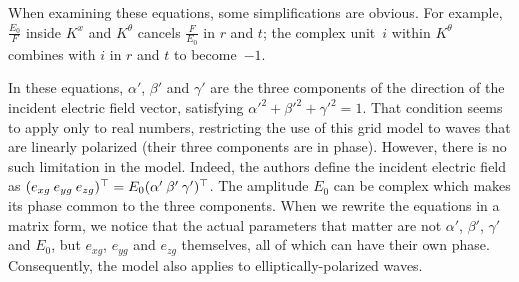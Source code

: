 When examining these equations, some simplifications are obvious.
For example, $\frac{E_0}{F}$ inside $K^x$ and $K^\theta$ cancels $\frac{F}{E_0}$ in $r$ and $t$;
the complex unit~$i$ within $K^\theta$ combines with $i$ in $r$ and $t$ to become~$-1$.

In these equations, $\alpha'$, $\beta'$ and $\gamma'$ are the three components of the direction of the incident electric field vector, satisfying $\alpha'^2 + \beta'^2 + \gamma'^2 = 1$.
That condition seems to apply only to real numbers, restricting the use of this grid model to waves that are linearly polarized (their three components are in phase).
However, there is no such limitation in the model.
Indeed, the authors define the incident electric field as
$(e_{xg} \: e_{yg} \: e_{zg})^\top = E_0(\alpha' \: \beta' \: \gamma')^\top$.
The amplitude $E_0$ can be complex which makes its phase common to the three components.
When we rewrite the equations in a matrix form, we notice that the actual parameters that matter are not $\alpha'$, $\beta'$, $\gamma'$ and $E_0$, but $e_{xg}$, $e_{yg}$ and $e_{zg}$ themselves, all of which can have their own phase.
Consequently, the model also applies to elliptically-polarized waves.

